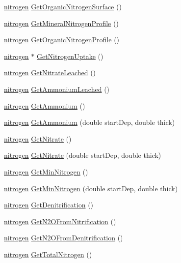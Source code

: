 \begin{DoxyCompactItemize}
\hyperlink{classnitrogen}{nitrogen} \hyperlink{classsoil_a6291595ad0ddda038615ab35da13d9f5}{GetOrganicNitrogenSurface} ()
\item 
\hyperlink{classnitrogen}{nitrogen} \hyperlink{classsoil_a19737ddea2fab36e4ddba698aa690a23}{GetMineralNitrogenProfile} ()
\item 
\hyperlink{classnitrogen}{nitrogen} \hyperlink{classsoil_ab1195730db52a55612ab8e4fb38b5aa7}{GetOrganicNitrogenProfile} ()
\item 
\hyperlink{classnitrogen}{nitrogen} $\ast$ \hyperlink{classsoil_a75c4eae711850b9fd61ebd85fb8d2d13}{GetNitrogenUptake} ()
\item 
\hyperlink{classnitrogen}{nitrogen} \hyperlink{classsoil_a76265ee1854179bc17203b1b2df1e4db}{GetNitrateLeached} ()
\item 
\hyperlink{classnitrogen}{nitrogen} \hyperlink{classsoil_a8320c94a76f8221bdfb6edf11f586fa6}{GetAmmoniumLeached} ()
\item 
\hyperlink{classnitrogen}{nitrogen} \hyperlink{classsoil_a103bd1bc57f62e9294194274c46ff7ef}{GetAmmonium} ()
\item 
\hyperlink{classnitrogen}{nitrogen} \hyperlink{classsoil_a78fed3554b176494a3e703dae8e8b31a}{GetAmmonium} (double startDep, double thick)
\item 
\hyperlink{classnitrogen}{nitrogen} \hyperlink{classsoil_a111760bc77c25164c82b3dbccf5e443a}{GetNitrate} ()
\item 
\hyperlink{classnitrogen}{nitrogen} \hyperlink{classsoil_a32c15401ff24079af4f9a8ac569bbb01}{GetNitrate} (double startDep, double thick)
\item 
\hyperlink{classnitrogen}{nitrogen} \hyperlink{classsoil_a200ce7594b17ce2c3561789aeb3cf81c}{GetMinNitrogen} ()
\item 
\hyperlink{classnitrogen}{nitrogen} \hyperlink{classsoil_a7b1b7b7110fd745719df083ba6292ac6}{GetMinNitrogen} (double startDep, double thick)
\item 
\hyperlink{classnitrogen}{nitrogen} \hyperlink{classsoil_ac7be4d148fee7795d9a5202ed0988e86}{GetDenitrification} ()
\item 
\hyperlink{classnitrogen}{nitrogen} \hyperlink{classsoil_aed2c30f9e15bc87564798a5bc67416b7}{GetN2OFromNitrification} ()
\item 
\hyperlink{classnitrogen}{nitrogen} \hyperlink{classsoil_ae1d8d1716f139c0999dcd5907d47aa2d}{GetN2OFromDenitrification} ()
\item 
\hyperlink{classnitrogen}{nitrogen} \hyperlink{classsoil_a9bea1a88a9531db940078010517f596a}{GetTotalNitrogen} ()

\end{DoxyCompactItemize}
